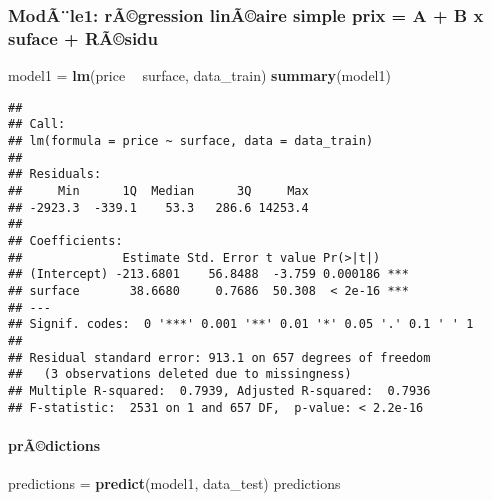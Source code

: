 \documentclass[]{article}
\newenvironment{Shaded}{\begin{snugshade}}{\end{snugshade}}
\newcommand{\KeywordTok}[1]{\textcolor[rgb]{0.13,0.29,0.53}{\textbf{#1}}}
\newcommand{\StringTok}[1]{\textcolor[rgb]{0.31,0.60,0.02}{#1}}
\newcommand{\OperatorTok}[1]{\textcolor[rgb]{0.81,0.36,0.00}{\textbf{#1}}}
\newcommand{\NormalTok}[1]{#1}
\let\oldparagraph\paragraph
\renewcommand{\paragraph}[1]{\oldparagraph{#1}\mbox{}}
\begin{document}
\subsubsection{ModÃ¨le1: rÃ©gression linÃ©aire simple prix = A + B x
suface +
RÃ©sidu}\label{modale1-ragression-linaaire-simple-prix-a-b-x-suface-rasidu}

\begin{Shaded}
\begin{Highlighting}[]
\NormalTok{model1 =}\StringTok{ }\KeywordTok{lm}\NormalTok{(price }\OperatorTok{~}\StringTok{ }\NormalTok{surface, data_train)}
\KeywordTok{summary}\NormalTok{(model1)}
\end{Highlighting}
\end{Shaded}

\begin{verbatim}
## 
## Call:
## lm(formula = price ~ surface, data = data_train)
## 
## Residuals:
##     Min      1Q  Median      3Q     Max 
## -2923.3  -339.1    53.3   286.6 14253.4 
## 
## Coefficients:
##              Estimate Std. Error t value Pr(>|t|)    
## (Intercept) -213.6801    56.8488  -3.759 0.000186 ***
## surface       38.6680     0.7686  50.308  < 2e-16 ***
## ---
## Signif. codes:  0 '***' 0.001 '**' 0.01 '*' 0.05 '.' 0.1 ' ' 1
## 
## Residual standard error: 913.1 on 657 degrees of freedom
##   (3 observations deleted due to missingness)
## Multiple R-squared:  0.7939, Adjusted R-squared:  0.7936 
## F-statistic:  2531 on 1 and 657 DF,  p-value: < 2.2e-16
\end{verbatim}

\paragraph{prÃ©dictions}\label{pradictions}

\begin{Shaded}
\begin{Highlighting}[]
\NormalTok{predictions =}\StringTok{ }\KeywordTok{predict}\NormalTok{(model1, data_test)}
\NormalTok{predictions}
\end{Highlighting}
\end{Shaded}
\end{document}

